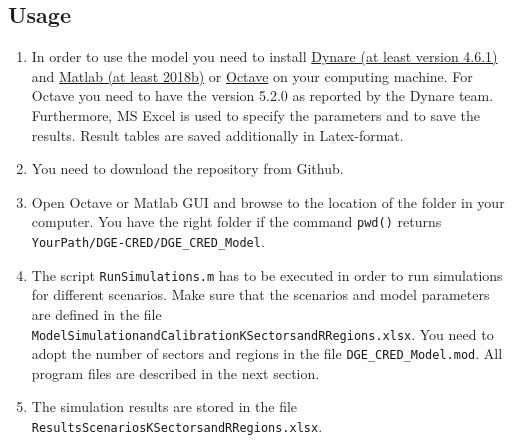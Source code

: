 \documentclass[10pt,a4paper]{article}
\begin{document}
\subsection{Usage}
\begin{enumerate}
\item In order to use the model you need to install \href{https://www.dynare.org/download/}{Dynare (at least version 4.6.1)} and \href{https://www.mathworks.com/products/matlab.html}{Matlab (at least 2018b)} or \href{https://www.gnu.org/software/octave/}{Octave} on your computing machine. 
For Octave you need to have the version 5.2.0 as reported by the Dynare team. 
Furthermore, MS Excel is used to specify the parameters and to save the results. Result tables are saved additionally in Latex-format.

\item You need to download the repository from Github. 
\item Open Octave or Matlab GUI and browse to the location of the folder in your computer. You have the right folder if the command {\tt pwd()} returns {\tt YourPath/DGE-CRED/DGE_CRED_Model}.
\item The script {\tt RunSimulations.m} has to be executed in order to run simulations for different scenarios. Make sure that the scenarios and model parameters are defined in the file \\ {\tt ModelSimulationandCalibrationKSectorsandRRegions.xlsx}. 
You need to adopt the number of sectors and regions in the file {\tt DGE\_CRED\_Model.mod}. All program files are described in the next section.
\item The simulation results are stored in the file {\tt ResultsScenariosKSectorsandRRegions.xlsx}.
\end{enumerate}
\end{document}
